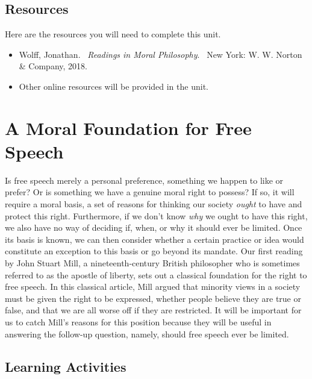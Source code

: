 \documentclass[
]{book}
\providecommand{\tightlist}{%
  \setlength{\itemsep}{0pt}\setlength{\parskip}{0pt}}
\begin{document}
\hypertarget{resources-4}{%
\subsection*{Resources}\label{resources-4}}

Here are the resources you will need to complete this unit.

\begin{itemize}
\tightlist
\item
  Wolff, Jonathan. ~\emph{Readings in Moral Philosophy}. ~New York: W. W. Norton \& Company, 2018.\\
\item
  Other online resources will be provided in the unit.
\end{itemize}

\hypertarget{a-moral-foundation-for-free-speech}{%
\section*{A Moral Foundation for Free Speech}\label{a-moral-foundation-for-free-speech}}

Is free speech merely a personal preference, something we happen to like or prefer? Or is something we have a genuine moral right to possess? If so, it will require a moral basis, a set of reasons for thinking our society \emph{ought} to have and protect this right.
Furthermore, if we don't know \emph{why} we ought to have this right, we also have no way of deciding if, when, or why it should ever be limited. Once its basis is known, we can then consider whether a certain practice or idea would constitute an exception to this basis or go beyond its mandate.
Our first reading by John Stuart Mill, a nineteenth-century British philosopher who is sometimes referred to as the apostle of liberty, sets out a classical foundation for the right to free speech. In this classical article, Mill argued that minority views in a society must be given the right to be expressed, whether people believe they are true or false, and that we are all worse off if they are restricted. It will be important for us to catch Mill's reasons for this position because they will be useful in answering the follow-up question, namely, should free speech ever be limited.

\hypertarget{learning-activities-11}{%
\subsection*{Learning Activities}\label{learning-activities-11}}
\end{document}
